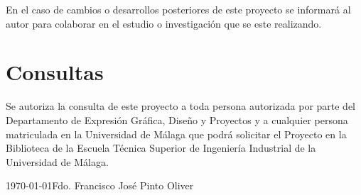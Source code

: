En el caso de cambios o desarrollos posteriores de este proyecto se informará al autor para colaborar en el estudio o investigación que se este realizando.

\section{Consultas}
Se autoriza la consulta de este proyecto a toda persona autorizada por parte del Departamento de Expresión Gráfica, Diseño y Proyectos y a cualquier persona matriculada en la Universidad de Málaga que podrá solicitar el Proyecto en la Biblioteca de la Escuela Técnica Superior de Ingeniería Industrial de la Universidad de Málaga.

\vspace{1cm}
\today \hfill Fdo. Francisco José Pinto Oliver
